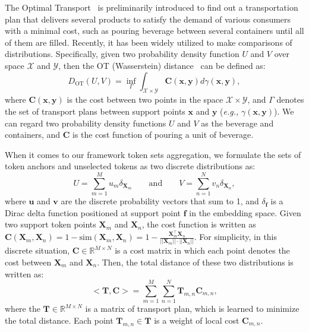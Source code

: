 The Optimal Transport~\citep{monge1781memoire} is preliminarily introduced to find out a transportation plan that delivers several products to satisfy the demand of various consumers with a minimal cost, such as pouring beverage between several containers until all of them are filled. Recently, it has been widely utilized to make comparisons of distributions. Specifically, given two probability density function $U$ and $V$ over space $\mathcal{X} $ and $\mathcal{Y} $, then the OT (Wasserstein) distance~\citep{thorpe2018introduction} can be defined as:
\begin{equation} 
\label{eq:wasserstein}
    D_{\text{OT}}(U,V) = \underset{\Gamma}{\inf}  \int_{\mathcal{X}\times\mathcal{Y} } \bm{C}(\bm{x},\bm{y}) d\gamma(\bm{x},\bm{y}),
\end{equation}
where $\bm{C}(\bm{x},\bm{y})$ is the cost between two points in the space $\mathcal{X}\times\mathcal{Y} $, and $\Gamma $ denotes the set of transport plans between support points $ \bm{x}$ and $ \bm{y}$ (\textit{e.g.,} $\gamma(\bm{x},\bm{y}) $). 
We can regard two probability density functions $U$ and $V$ as the beverage and containers, and $\bm{C}$ is the cost function of pouring a unit of beverage.




When it comes to our framework token sets aggregation, we formulate the sets of token anchors and unselected tokens as two discrete distributions as:
\begin{equation} 
\label{eq:discrete23}
    U=\sum_{m=1}^{M}u_m\delta_{\bm{X}_m} \hspace{2em} \text{and} \hspace{2em} V=\sum_{n=1}^{N}v_n\delta_{\bm{X}_n},
\end{equation}
where $\bm{u}$ and $\bm{v}$ are the discrete probability vectors that sum to 1, and $\delta_{\bm{f}}$ is a Dirac delta function positioned at support point $\bm{f}$ in the embedding space. Given two support token points $\bm{X}_m$ and $\bm{X}_n$, the cost function is written as $\bm{C} (\bm{X}_m,\bm{X}_n )= 1- \text{sim}(\bm{X}_m,\bm{X}_{n})= 1-\frac{\bm{X}_m^\top\bm{X}_{n}}{||\bm{X}_m||\cdot||\bm{X}_{n}||}$. 
For simplicity, in this discrete situation, $\bm{C} \in \mathbb{R}^{M\times N}$ is a cost matrix in which each point denotes the cost between $\bm{X}_m$ and $\bm{X}_n$.
Then, the total distance of these two distributions is written as:
\begin{equation} 
\label{eq:cost2}
    <\bm{T},\bm{C}> = \sum_{m=1}^{M}\sum_{n=1}^{N}\bm{T}_{m,n}\bm{C}_{m,n},
\end{equation}
where the $\bm{T} \in \mathbb{R}^{M\times N} $ is a matrix of transport plan, which is learned to minimize the total distance. Each point $\bm{T}_{m,n} \in \bm{T}$ is a weight of local cost $\bm{C}_{m,n} $.

